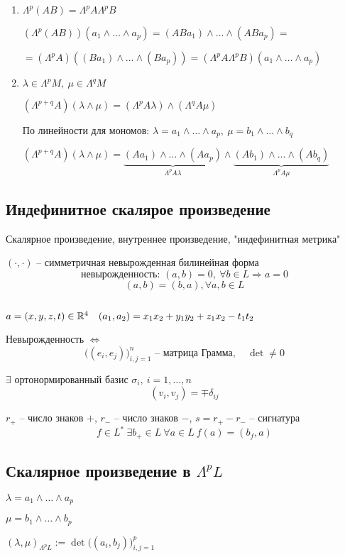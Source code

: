     \begin{enumerate}
        \item \par $\Lambda^p(AB) = \Lambda^p A \Lambda^p B$
            \par $(\Lambda^p(AB)) (a_1 \wedge \dots \wedge a_p) = (ABa_1) \wedge \dots \wedge (ABa_p) = $
            \par $= (\Lambda^p A)((Ba_1) \wedge \dots \wedge (Ba_p)) = (\Lambda^p A \Lambda^p B)(a_1 \wedge \dots \wedge a_p)$
        \item $\lambda \in \Lambda^p M, \ \mu \in \Lambda^q M$
            \par $(\Lambda^{p+q}A)(\lambda \wedge \mu) = (\Lambda^p A\lambda) \wedge (\Lambda^q A \mu)$
            \par По линейности для мономов: $\lambda = a_1 \wedge \dots \wedge a_p, \ \mu = b_1 \wedge \dots \wedge b_q$
            \par $(\Lambda^{p+q}A)(\lambda \wedge \mu) = \underbrace{(Aa_1) \wedge \dots \wedge (Aa_p)}_{\Lambda^p A\lambda} \wedge \underbrace{(Ab_1) \wedge \dots \wedge (Ab_q)}_{\Lambda^p A\mu}$
    \end{enumerate}

    \subsection*{Индефинитное скалярое произведение}

    \par Скалярное произведение, внутреннее произведение, "индефинитная метрика"
    \par $(\cdot, \cdot)$ -- симметричная невырожденная билинейная форма
    \[
        \text{невырожденность: } (a, b) = 0, \ \forall b \in L \Rightarrow a = 0    
    \]
    \[
        (a, b) = (b, a), \forall a, b \in L    
    \]

    \begin{illustration*}
        $ $
        \par $a = (x, y, z, t) \in \mathbb{R}^4 \quad (a_1, a_2) = x_1x_2 + y_1y_2 + z_1x_2 - t_1t_2$
    \end{illustration*}

    \par Невырожденность $\Leftrightarrow$ \[
        \bigg((e_i, e_j)\bigg)_{i, j = 1}^n \text{ -- матрица Грамма}, \quad \det \not= 0
    \]
    \par $\exists$ ортонормированный базис $\sigma_i, \ i = 1, \dots, n$
    \[
        (v_i, v_j) = \mp \delta_{ij}    
    \]
    \par $r_+$ -- число знаков $+$, $r_-$ -- число знаков $-$, $s = r_+ - r_-$ -- сигнатура %
    \[
        f \in L^* \ \exists b_+ \in L \ \forall a \in L \ f(a) = (b_f, a)
    \]

    \subsection*{Скалярное произведение в $\Lambda^p L$}

    \par $\lambda = a_1 \wedge \dots \wedge a_p$
    \par $\mu = b_1 \wedge \dots \wedge b_p$
    \par $(\lambda, \mu)_{\Lambda^p L} := \det \bigg((a_i, b_j)\bigg)_{i, j = 1}^p$

